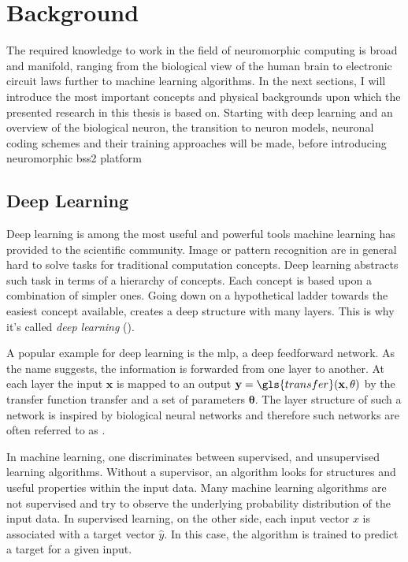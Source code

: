 \chapter{Background}
The required knowledge to work in the field of neuromorphic computing is broad and manifold, ranging from the biological view of the human brain to electronic circuit laws further to machine learning algorithms. In the next sections, I will introduce the most important concepts and physical backgrounds upon which the presented research in this thesis is based on. Starting with deep learning and an overview of the biological neuron, the transition to neuron models, neuronal coding schemes and their training approaches will be made, before introducing neuromorphic \gls{bss2} platform 
\section{Deep Learning}
\label{deeplearning}
Deep learning is among the most useful and powerful tools machine learning has provided to the scientific community. Image or pattern recognition are in general hard to solve tasks for traditional computation concepts. Deep learning abstracts such task in terms of a hierarchy of concepts. Each concept is based upon a combination of simpler ones. Going down on a hypothetical ladder towards the easiest concept available, creates a deep structure with many layers. This is why it's called \emph{deep learning} (\cite{Goodfellow-et-al-2016}).

A popular example for deep learning is the \gls{mlp}, a deep feedforward network. As the name suggests, the information is forwarded from one layer to another. At each layer the input $\mathbf{x}$ is mapped to an output $\mathbf{y} = \gls{transfer}(\mathbf{x, \theta})$ by the transfer function \gls{transfer} and a set of parameters $\mathbf{\theta}$. The layer structure of such a network is inspired by biological neural networks and therefore such networks are often referred to as .

In machine learning, one discriminates between supervised, and unsupervised learning algorithms. Without a supervisor, an algorithm looks for structures and useful properties within the input data. Many machine learning algorithms are not supervised and try to observe the underlying probability distribution of the input data. In supervised learning, on the other side, each input vector $x$ is associated with a target vector $\hat{y}$. In this case, the algorithm is trained to predict a target for a given input.

